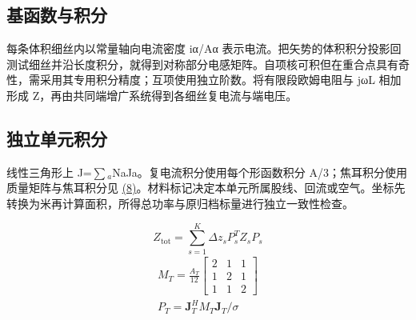 \documentclass[11pt]{article}
\begin{document}
\subsection*{基函数与积分}
\hypertarget{S1.peec_derivation.heading}{}
每条体积细丝内以常量轴向电流密度 iα/Aα 表示电流。把矢势的体积积分投影回测试细丝并沿长度积分，就得到对称部分电感矩阵。自项核可积但在重合点具有奇性，需采用其专用积分精度；互项使用独立阶数。将有限段欧姆电阻与 jωL 相加形成 Z，再由共同端增广系统得到各细丝复电流与端电压。


\subsection*{独立单元积分}
\hypertarget{S1.triangle_derivation.heading}{}
线性三角形上 J=\(\sum\)\(_a\)NaJa。复电流积分使用每个形函数积分 A/3；焦耳积分使用质量矩阵与焦耳积分见 \href{paper_zh-CN_single.pdf#E09}{(8)}。材料标记决定本单元所属股线、回流或空气。坐标先转换为米再计算面积，所得总功率与原归档标量进行独立一致性检查。


\hypertarget{E06}{}\begin{equation}Z_{\mathrm{tot}}=\sum_{s=1}^{K}\Delta z_s P_s^T Z_s P_s\tag{7}\label{eq:E06}\end{equation}
\hypertarget{E09}{}
\begin{equation}
\begin{gathered}
M_T=\frac{A_T}{12}\begin{bmatrix}2&1&1\\1&2&1\\1&1&2\end{bmatrix} \\
P_T=\mathbf J_T^H M_T\mathbf J_T/\sigma
\end{gathered}
\tag{8}\label{eq:E09}
\end{equation}
\end{document}

